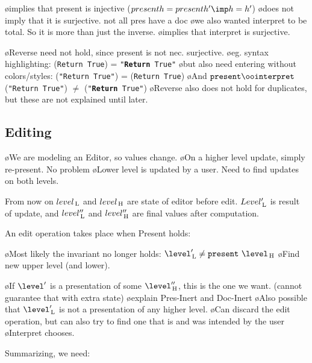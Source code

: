 
\bl
\o implies that present is injective ($present h = present h' \imp h = h'$)
\o does not imply that it is surjective. not all pres have a doc
\o we also wanted interpret to be total. So it is more than just the inverse. 
\o implies that interpret is surjective.
\el

\bl
\o Reverse need not hold, since present is not nec. surjective.
\o eg. syntax highlighting: \present ({\tt Return True}) = {\tt "{\bf Return} True"}
\o but also need entering without colors/styles: \interpret ({\tt "Return True"}) = ({\tt Return True})
\o And $\present \oo \interpret$ ({\tt "Return True"}) $\neq$ ({\tt "{\bf Return} True"}) 
\o Reverse also does not hold for duplicates, but these are not explained until later.
\el

\subsection{Editing}

\bl
\o We are modeling an Editor, so values change.
\o On a higher level update, simply re-present. No problem
\o Lower level is updated by a user. Need to find updates on both levels.
\el


From now on $level_{\, \mathrm L}$ and $level_{\, \mathrm H}$ are state of editor before edit. $Level'_{\, \mathrm L}$ is result of update, and  $level''_{\, \mathrm L}$ and $level''_{\, \mathrm H}$ are final values after computation.

An edit operation takes place when {\sc Present} holds:


\bl
\o Most likely the invariant no longer holds: $\level'\L \neq \present~\level\H$
\o Find new upper level (and lower).
\el

\bl 
\o If  $\level'$ is a presentation of some $\level''\H$, this is the one we want. (cannot guarantee that with extra state)
\o explain {\sc Pres-Inert} and {\sc Doc-Inert}
\o Also possible that $\level'\L$ is not a presentation of any higher level. 
\o Can discard the edit operation, but can also try to find one that is and was intended by the user
\o Interpret chooses.
\el

Summarizing, we need:


